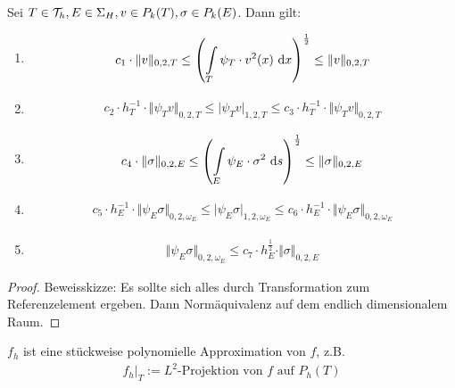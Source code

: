 \begin{theorem}
	Sei $T\in\mathcal{T}_h,E\in\Sigma_H, v\in P_k(T), \sigma\in P_k(E)$. Dann gilt:
	\begin{enumerate}[label=(\arabic*)]
		\item 
		\begin{align*}
c_1\cdot\Vert v\Vert_{0,2,T}
\leq\left(\int\limits_T\psi_T\cdot v^2(x)\text{ d} x\right)^{\frac{1}{2}} \leq\Vert v\Vert_{0,2,T}
		\end{align*}
		\item
		\begin{align*}
c_2\cdot h_T^{-1}\cdot\big\Vert\psi_T v\big\Vert_{0,2,T}\leq\big|\psi_T v\big|_{1,2,T}\leq c_3\cdot h_T^{-1}\cdot\big\Vert\psi_T v\big\Vert_{0,2,T}
		\end{align*}
		\item
		\begin{align*}
c_4\cdot\Vert\sigma\Vert_{0,2,E} \leq\left(\int\limits_E\psi_E\cdot\sigma^2\text{ d} s\right)^{\frac{1}{2}}\leq \Vert\sigma\Vert_{0,2,E}
		\end{align*}
		\item
		\begin{align*}
c_5\cdot h_E^{-1}\cdot\big\Vert\psi_E\sigma\big\Vert_{0,2,\omega_E}
\leq\big|\psi_E\sigma\big|_{1,2,\omega_E}
\leq c_6\cdot h_E^{-1}\cdot\big\Vert\psi_E\sigma\big\Vert_{0,2,\omega_E}
		\end{align*}
		\item 
		\begin{align*}
\big\Vert\psi_E\sigma\big\Vert_{0,2,\omega_E}
\leq c_7\cdot h_E^{\frac{1}{2}}\cdot\Vert\sigma\Vert_{0,2,E}
		\end{align*}
	\end{enumerate}
\end{theorem}
\begin{proof}
	Beweisskizze: Es sollte sich alles durch Transformation zum Referenzelement ergeben. Dann Normäquivalenz auf dem endlich dimensionalem Raum.
\end{proof}

$f_h$ ist eine stückweise  polynomielle Approximation von $f$, z.B.
\begin{align*}
	f_h\big|_T:=L^2\text{-Projektion von $f$ auf }P_h(T)
\end{align*}

